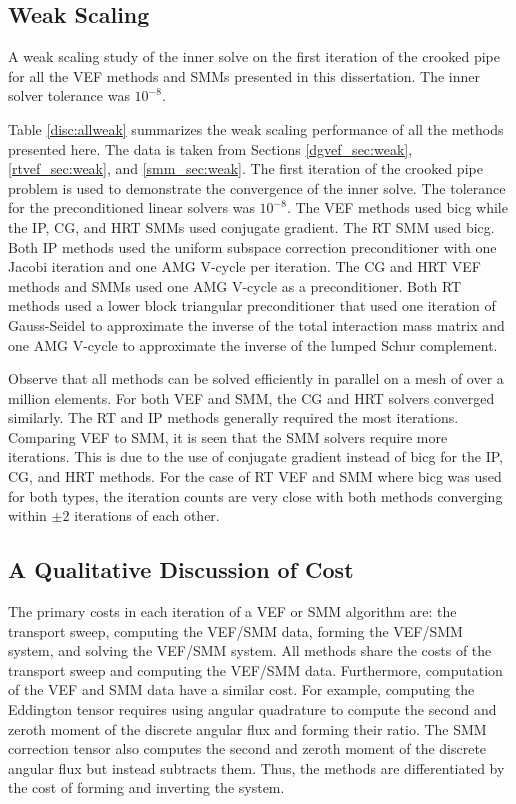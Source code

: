 \documentclass[../doc.tex]{subfiles}
\begin{document}
\subsection{Weak Scaling}
\begin{table}
\centering
\caption{A weak scaling study of the inner solve on the first iteration of the crooked pipe for all the VEF methods and SMMs presented in this dissertation. The inner solver tolerance was $10^{-8}$.}
\label{disc:allweak}

\end{table}
Table \ref{disc:allweak} summarizes the weak scaling performance of all the methods presented here. The data is taken from Sections \ref{dgvef_sec:weak}, \ref{rtvef_sec:weak}, and \ref{smm_sec:weak}. The first iteration of the crooked pipe problem is used to demonstrate the convergence of the inner solve. The tolerance for the preconditioned linear solvers was $10^{-8}$. The VEF methods used \gls{bicg} while the IP, CG, and HRT SMMs used conjugate gradient. The RT SMM used \gls{bicg}. Both IP methods used the uniform subspace correction preconditioner with one Jacobi iteration and one AMG V-cycle per iteration. The CG and HRT VEF methods and SMMs used one AMG V-cycle as a preconditioner. Both RT methods used a lower block triangular preconditioner that used one iteration of Gauss-Seidel to approximate the inverse of the total interaction mass matrix and one AMG V-cycle to approximate the inverse of the lumped Schur complement. 

Observe that all methods can be solved efficiently in parallel on a mesh of over a million elements. For both VEF and SMM, the CG and HRT solvers converged similarly. The RT and IP methods generally required the most iterations. Comparing VEF to SMM, it is seen that the SMM solvers require more iterations. This is due to the use of conjugate gradient instead of \gls{bicg} for the IP, CG, and HRT methods. For the case of RT VEF and SMM where \gls{bicg} was used for both types, the iteration counts are very close with both methods converging within $\pm 2$ iterations of each other. 

\subsection{A Qualitative Discussion of Cost} \label{disc_sec:cost}
The primary costs in each iteration of a VEF or SMM algorithm are: the transport sweep, computing the VEF/SMM data, forming the VEF/SMM system, and solving the VEF/SMM system. All methods share the costs of the transport sweep and computing the VEF/SMM data. Furthermore, computation of the VEF and SMM data have a similar cost. For example, computing the Eddington tensor requires using angular quadrature to compute the second and zeroth moment of the discrete angular flux and forming their ratio. The SMM correction tensor also computes the second and zeroth moment of the discrete angular flux but instead subtracts them. Thus, the methods are differentiated by the cost of forming and inverting the system. 
\end{document}
